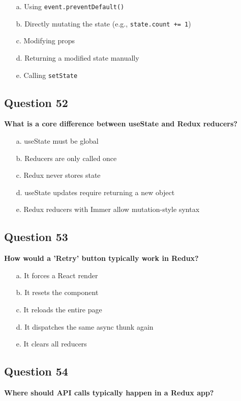 \documentclass{article}
\begin{document}
\begin{itemize}
  \item[a.] Using \texttt{event.preventDefault()}
  \item[b.] Directly mutating the state (e.g., \texttt{state.count += 1})
  \item[c.] Modifying props
  \item[d.] Returning a modified state manually
  \item[e.] Calling \texttt{setState}
\end{itemize}

\subsection*{Question 52}
\textbf{What is a core difference between useState and Redux reducers?}

\begin{itemize}
  \item[a.] useState must be global
  \item[b.] Reducers are only called once
  \item[c.] Redux never stores state
  \item[d.] useState updates require returning a new object
  \item[e.] Redux reducers with Immer allow mutation-style syntax
\end{itemize}

\subsection*{Question 53}
\textbf{How would a 'Retry' button typically work in Redux?}

\begin{itemize}
  \item[a.] It forces a React render
  \item[b.] It resets the component
  \item[c.] It reloads the entire page
  \item[d.] It dispatches the same async thunk again
  \item[e.] It clears all reducers
\end{itemize}

\subsection*{Question 54}
\textbf{Where should API calls typically happen in a Redux app?}
\end{document}
